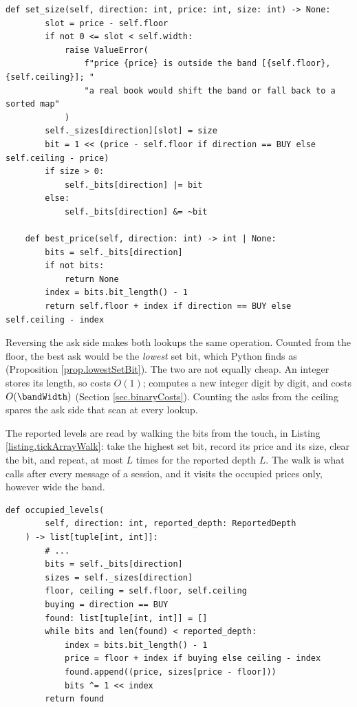 \begin{lstlisting}[caption={\protect\codehl{unito26.lob.orderbook.TickArrayBook}: a write, and the best price.}, label=listing.tickArrayWrite]
    def set_size(self, direction: int, price: int, size: int) -> None:
        slot = price - self.floor
        if not 0 <= slot < self.width:
            raise ValueError(
                f"price {price} is outside the band [{self.floor}, {self.ceiling}]; "
                "a real book would shift the band or fall back to a sorted map"
            )
        self._sizes[direction][slot] = size
        bit = 1 << (price - self.floor if direction == BUY else self.ceiling - price)
        if size > 0:
            self._bits[direction] |= bit
        else:
            self._bits[direction] &= ~bit

    def best_price(self, direction: int) -> int | None:
        bits = self._bits[direction]
        if not bits:
            return None
        index = bits.bit_length() - 1
        return self.floor + index if direction == BUY else self.ceiling - index
\end{lstlisting}

Reversing the ask side makes both lookups the same operation.
Counted from the floor, the best ask would be the \emph{lowest} set bit,
which Python finds as 
(Proposition \ref{prop.lowestSetBit}).
The two are not equally cheap.
An integer stores its length, so  costs $O(1)$;
 computes a new integer digit by digit, and costs $O(\bandWidth)$
(Section \ref{sec.binaryCosts}).
Counting the asks from the ceiling spares the ask side that scan at every lookup.

The reported levels are read by walking the bits from the touch,
in Listing \ref{listing.tickArrayWalk}:
take the highest set bit, record its price and its size, clear the bit, and repeat,
at most $L$ times for the reported depth $L$.
The walk is what  calls after every message of a session,
and it visits the occupied prices only, however wide the band.

\begin{lstlisting}[caption={\protect\codehl{unito26.lob.orderbook.TickArrayBook.occupied\_levels}, with its docstring and its check of the argument elided.}, label=listing.tickArrayWalk]
    def occupied_levels(
        self, direction: int, reported_depth: ReportedDepth
    ) -> list[tuple[int, int]]:
        # ...
        bits = self._bits[direction]
        sizes = self._sizes[direction]
        floor, ceiling = self.floor, self.ceiling
        buying = direction == BUY
        found: list[tuple[int, int]] = []
        while bits and len(found) < reported_depth:
            index = bits.bit_length() - 1
            price = floor + index if buying else ceiling - index
            found.append((price, sizes[price - floor]))
            bits ^= 1 << index
        return found
\end{lstlisting}

